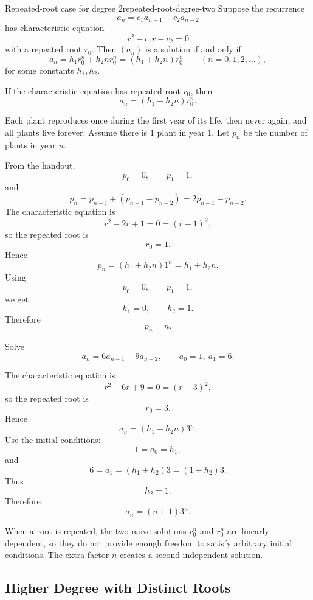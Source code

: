 \begin{theorem}{Repeated-root case for degree 2}{repeated-root-degree-two}
Suppose the recurrence
\[
a_n=c_1a_{n-1}+c_2a_{n-2}
\]
has characteristic equation
\[
r^2-c_1r-c_2=0
\]
with a repeated root $r_0$. Then $(a_n)$ is a solution if and only if
\[
a_n=h_1r_0^n+h_2nr_0^n
=(h_1+h_2n)r_0^n
\qquad (n=0,1,2,\dots),
\]
for some constants $h_1,h_2$.
\end{theorem}

\begin{keyformula}[title={Repeated-root form}]
If the characteristic equation has repeated root $r_0$, then
\[
a_n=(h_1+h_2n)r_0^n.
\]
\end{keyformula}

\begin{examplebox}[title={Plant model from the handout}]
Each plant reproduces once during the first year of its life, then never again, and all plants live forever. Assume there is $1$ plant in year $1$. Let $p_n$ be the number of plants in year $n$.

From the handout,
\[
p_0=0,\qquad p_1=1,
\]
and
\[
p_n=p_{n-1}+(p_{n-1}-p_{n-2})=2p_{n-1}-p_{n-2}.
\]
The characteristic equation is
\[
r^2-2r+1=0=(r-1)^2,
\]
so the repeated root is
\[
r_0=1.
\]
Hence
\[
p_n=(h_1+h_2n)1^n=h_1+h_2n.
\]
Using
\[
p_0=0,\qquad p_1=1,
\]
we get
\[
h_1=0,\qquad h_2=1.
\]
Therefore
\[
\boxed{p_n=n.}
\]
\end{examplebox}

\begin{examplebox}[title={Example 5 from the handout}]
Solve
\[
a_n=6a_{n-1}-9a_{n-2},
\qquad
a_0=1,\ a_1=6.
\]

The characteristic equation is
\[
r^2-6r+9=0=(r-3)^2,
\]
so the repeated root is
\[
r_0=3.
\]
Hence
\[
a_n=(h_1+h_2n)3^n.
\]
Use the initial conditions:
\[
1=a_0=h_1,
\]
and
\[
6=a_1=(h_1+h_2)3=(1+h_2)3.
\]
Thus
\[
h_2=1.
\]
Therefore
\[
\boxed{a_n=(n+1)3^n.}
\]
\end{examplebox}

\begin{extension}[title={Why the extra factor of $n$ appears}]
When a root is repeated, the two naive solutions $r_0^n$ and $r_0^n$ are linearly dependent, so they do not provide enough freedom to satisfy arbitrary initial conditions. The extra factor $n$ creates a second independent solution.
\end{extension}

\subsection{Higher Degree with Distinct Roots}

